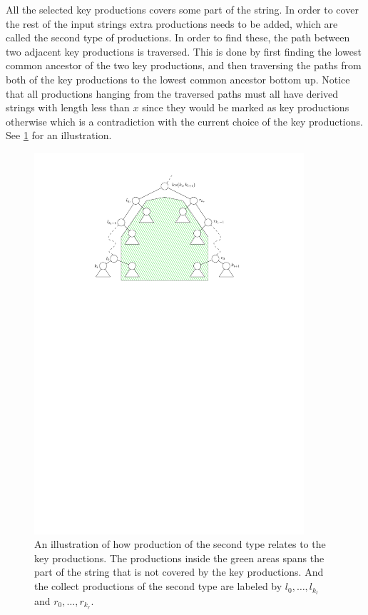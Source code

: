 \documentclass[twoside,11pt,openright]{report}
\begin{document}
All the selected key productions covers some part of the string. In order to cover the rest of the input strings extra productions needs to be added, which are called the second type of productions. In order to find these, the path between two adjacent key productions is traversed. This is done by first finding the lowest common ancestor of the two key productions, and then traversing the paths from both of the key productions to the lowest common ancestor bottom up. Notice that all productions hanging from the traversed paths must all have derived strings with length less than $x$ since they would be marked as key productions otherwise which is a contradiction with the current choice of the key productions. See \cref{fig:slp-2nd-type} for an illustration.

\begin{figure}[!htb]
  \centering
  \includegraphics[width=10cm]{images/slp-2nd-type}
  \caption{An illustration of how production of the second type relates to the key productions. The productions inside the green areas spans the part of the string that is not covered by the key productions. And the collect productions of the second type are labeled by $l_0, \dots, l_{k_l}$ and $r_0, \dots, r_{k_r}$.}
  \label{fig:slp-2nd-type}
\end{figure}
\end{document}
